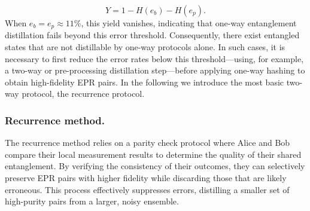 \documentclass[onecolumn,prx,longbibliography,nofootinbib, superscriptaddress]{revtex4-2}
\theoremstyle{recap}
\begin{document}
\begin{equation}
    Y=1-H(e_b)-H(e_p).
\end{equation}
When $e_b = e_p \approx 11\%$, this yield vanishes, indicating that one-way entanglement distillation fails beyond this error threshold. Consequently, there exist entangled states that are not distillable by one-way protocols alone. In such cases, it is necessary to first reduce the error rates below this threshold—using, for example, a two-way or pre-processing distillation step—before applying one-way hashing to obtain high-fidelity EPR pairs. In the following we introduce the most basic two-way protocol, the recurrence protocol.

\subsubsection{Recurrence method.}
The recurrence method relies on a parity check protocol where Alice and Bob compare their local measurement results to determine the quality of their shared entanglement. By verifying the consistency of their outcomes, they can selectively preserve EPR pairs with higher fidelity while discarding those that are likely erroneous. This process effectively suppresses errors, distilling a smaller set of high-purity pairs from a larger, noisy ensemble. 
\end{document}
